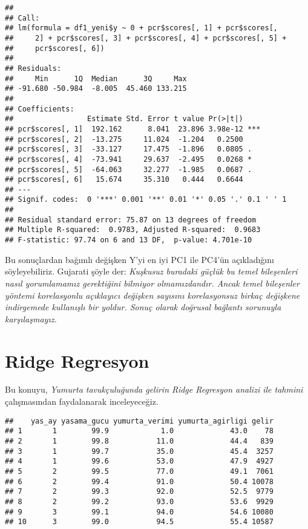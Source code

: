 \documentclass[
]{book}
\newenvironment{Shaded}{\begin{snugshade}}{\end{snugshade}}
\newcommand{\CommentTok}[1]{\textcolor[rgb]{0.56,0.35,0.01}{\textit{#1}}}
\newcommand{\DecValTok}[1]{\textcolor[rgb]{0.00,0.00,0.81}{#1}}
\newcommand{\KeywordTok}[1]{\textcolor[rgb]{0.13,0.29,0.53}{\textbf{#1}}}
\newcommand{\NormalTok}[1]{#1}
\newcommand{\OperatorTok}[1]{\textcolor[rgb]{0.81,0.36,0.00}{\textbf{#1}}}
\newcommand{\OtherTok}[1]{\textcolor[rgb]{0.56,0.35,0.01}{#1}}
\newcommand{\StringTok}[1]{\textcolor[rgb]{0.31,0.60,0.02}{#1}}
\begin{document}
\begin{verbatim}
## 
## Call:
## lm(formula = df1_yeni$y ~ 0 + pcr$scores[, 1] + pcr$scores[, 
##     2] + pcr$scores[, 3] + pcr$scores[, 4] + pcr$scores[, 5] + 
##     pcr$scores[, 6])
## 
## Residuals:
##     Min      1Q  Median      3Q     Max 
## -91.680 -50.984  -8.005  45.460 133.215 
## 
## Coefficients:
##                 Estimate Std. Error t value Pr(>|t|)    
## pcr$scores[, 1]  192.162      8.041  23.896 3.98e-12 ***
## pcr$scores[, 2]  -13.275     11.024  -1.204   0.2500    
## pcr$scores[, 3]  -33.127     17.475  -1.896   0.0805 .  
## pcr$scores[, 4]  -73.941     29.637  -2.495   0.0268 *  
## pcr$scores[, 5]  -64.063     32.277  -1.985   0.0687 .  
## pcr$scores[, 6]   15.674     35.310   0.444   0.6644    
## ---
## Signif. codes:  0 '***' 0.001 '**' 0.01 '*' 0.05 '.' 0.1 ' ' 1
## 
## Residual standard error: 75.87 on 13 degrees of freedom
## Multiple R-squared:  0.9783, Adjusted R-squared:  0.9683 
## F-statistic: 97.74 on 6 and 13 DF,  p-value: 4.701e-10
\end{verbatim}

Bu sonuçlardan bağımlı değişken Y'yi en iyi PC1 ile PC4'ün açıkladığını söyleyebiliriz. Gujarati şöyle der: \emph{Kuşkusuz buradaki güçlük bu temel bileşenleri nasıl yorumlamamız gerektiğini bilmiyor olmamızdandır. Ancak temel bileşenler yöntemi korelasyonlu açıklayıcı değişken sayısını korelasyonsuz birkaç değişkene indirgemede kullanışlı bir yoldur. Sonuç olarak doğrusal bağlantı sorunuyla karşılaşmayız.}

\hypertarget{ridge-regresyon}{%
\section{Ridge Regresyon}\label{ridge-regresyon}}

Bu konuyu, \emph{Yumurta tavukçuluğunda gelirin Ridge Regresyon analizi ile tahmini} çalışmasından faydalanarak inceleyeceğiz.

\begin{Shaded}
\end{Shaded}

\begin{verbatim}
##    yas_ay yasama_gucu yumurta_verimi yumurta_agirligi gelir
## 1       1        99.9            1.0             43.0    78
## 2       1        99.8           11.0             44.4   839
## 3       1        99.7           35.0             45.4  3257
## 4       1        99.6           53.0             47.9  4927
## 5       2        99.5           77.0             49.1  7061
## 6       2        99.4           91.0             50.4 10078
## 7       2        99.3           92.0             52.5  9779
## 8       2        99.2           93.0             53.6  9929
## 9       3        99.1           94.0             54.6 10080
## 10      3        99.0           94.5             55.4 10587
\end{verbatim}
\end{document}
